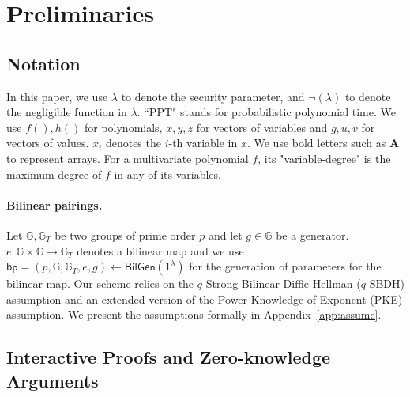 \section{Preliminaries}
\label{sec::prelim}

\subsection{Notation}

In this paper, we use $\lambda$ to denote the security parameter, and $\neg(\lambda)$ to denote the negligible function in $\lambda$. ``PPT" stands for probabilistic polynomial time. We use $f(),h()$ for polynomials, $x,y,z$ for vectors of variables and $g,u,v$ for vectors of values. $x_i$ denotes the $i$-th variable in $x$. We use bold letters such as $\textbf{A}$ to represent arrays. For a multivariate polynomial $f$, its "variable-degree" is the maximum degree of $f$ in any of its variables.

\paragraph{Bilinear pairings.} Let $\mathbb{G}, \mathbb{G}_T$ be two groups of prime order $p$ and let $g\in\mathbb{G}$ be a generator. $e: \mathbb{G}\times\mathbb{G}\rightarrow\mathbb{G}_T$ denotes a bilinear map and we use $\mathsf{bp}=(p,\mathbb{G},\mathbb{G}_T,e,g)\leftarrow\mathsf{BilGen}(1^\lambda)$ for the generation of parameters for the bilinear map. Our scheme relies on the $q$-Strong Bilinear Diffie-Hellman ($q$-SBDH) assumption and an extended version of the Power Knowledge of Exponent (PKE) assumption. We present the assumptions formally in Appendix~\ref{app:assume}.



\subsection{Interactive Proofs and Zero-knowledge Arguments}

